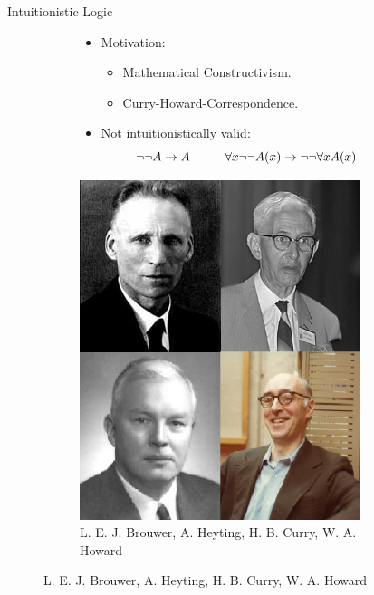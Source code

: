\documentclass{cubeamer}
\begin{document}
	\begin{frame}{Intuitionistic Logic}
		\begin{figure}[!tbp]
			\centering
			\begin{subfigure}[][][t]{0.6\textwidth}
				\begin{itemize}
					\item Motivation:
					\begin{itemize}
						\item Mathematical Constructivism.
						\item Curry-Howard-Correspondence.
					\end{itemize}
					\item Not intuitionistically valid:
					$$\neg\neg A\to A\hspace*{1cm} \forall x\neg\neg A(x)\to \neg\neg\forall x A(x)$$
				\end{itemize}
			\end{subfigure}
			\hfill
			\begin{subfigure}[]{0.3\textwidth}
				\centering
				\includegraphics[width=0.9\textwidth]{logicians.png}
				\caption{L. E. J. Brouwer, A. Heyting, H. B. Curry, W. A. Howard}
			\end{subfigure}
		\end{figure}
	\end{frame}
\end{document}
